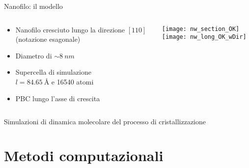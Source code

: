\documentclass{beamer}
\begin{document}
\begin{frame}{Nanofilo: il modello}
 \begin{columns}
  \begin{column}{0.5\textwidth}
    \begin{itemize}
      \item Nanofilo cresciuto lungo la {\ev direzione $[110]$}\\ (notazione esagonale)
      \item Diametro di $\sim \SI{8}{nm}$
      \item Supercella di simulazione \\ {\ev$l=\SI{84.65}{\angstrom}$} e {\ev\num{16540} atomi}
      \item PBC lungo l'asse di crescita
  \end{itemize}
  \end{column}
  \begin{column}{0.5\textwidth}
   \centering
   \texttt{[image: nw\_section\_OK]}\\[3pt]
   \texttt{[image: nw\_long\_OK\_wDir]}
  \end{column}
 \end{columns}
 \vspace{0.2cm}
 \centering
 Simulazioni di {\ev dinamica molecolare} del processo di cristallizzazione%
\end{frame}





\section{Metodi computazionali}

\end{document}
